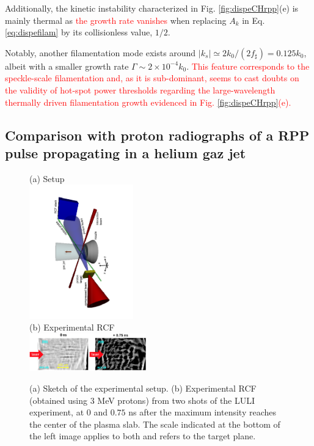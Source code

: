 \documentclass[
 reprint,
 superscriptaddress,
 amsmath,amssymb,
 aps,
]{revtex4-1}
\def\tc{\textcolor{red}}
\begin{document}
Additionally, the kinetic instability characterized in Fig. \ref{fig:dispeCHrpp}(e)  is mainly thermal as \tc{ the growth rate vanishes} when   replacing  $A_k$ in Eq. \eqref{eq:dispefilam} by its collisionless value, $1/2$. 

Notably, another filamentation mode exists around  $\vert k_s\vert \simeq 2k_0/(2f_\sharp) = 0.125k_0$, albeit with a smaller growth rate $\Gamma\sim 2\times 10^{-4}k_0 $. \tc{This feature corresponds to the speckle-scale filamentation and, as it is sub-dominant, seems to cast doubts on the validity of hot-spot power thresholds \cite[]{POF_Max_1976,POP_Williams_2006} regarding the large-wavelength thermally driven  filamentation growth evidenced in Fig.   \ref{fig:dispeCHrpp}(e).}

\subsection{Comparison with proton radiographs of a RPP pulse propagating in a helium gaz jet}\label{sec:xp}
\begin{figure}
(a) Setup \\
\includegraphics[width=0.4\textwidth,angle=-90]{set_up.pdf}\\
(b) Experimental RCF \\
\includegraphics[width=0.45\textwidth]{rcf.png}
\caption{ \label{fig:xpfuchs_xp}  
(a) Sketch of the experimental setup.
(b) Experimental RCF (obtained using 3 MeV protons) from two shots of the LULI experiment, at $0$ and $0.75$ ns after the maximum intensity reaches the center of the plasma slab.  The scale indicated at the bottom of the left image applies to both and refers to the target plane. 
 }
\end{figure}
\end{document}
